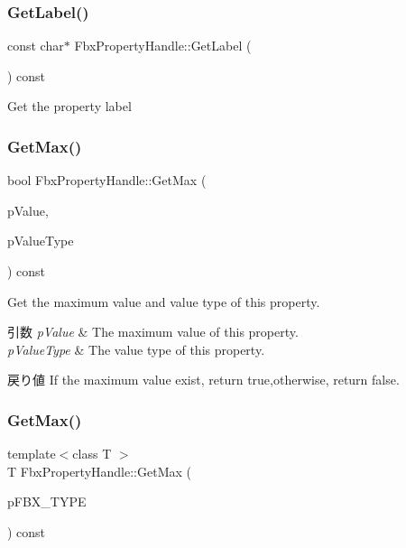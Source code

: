 \subsubsection{\texorpdfstring{Get\+Label()}{GetLabel()}}
{\footnotesize\ttfamily const char$\ast$ Fbx\+Property\+Handle\+::\+Get\+Label (\begin{DoxyParamCaption}{ }\end{DoxyParamCaption}) const}



Get the property label 

\mbox{\label{class_fbx_property_handle_a4752eebe7303b15577355b8fbecd4c6b}} 
\subsubsection{\texorpdfstring{Get\+Max()}{GetMax()}\hspace{0.1cm}{\footnotesize\ttfamily [1/2]}}
{\footnotesize\ttfamily bool Fbx\+Property\+Handle\+::\+Get\+Max (\begin{DoxyParamCaption}\item[{void $\ast$}]{p\+Value,  }\item[{\hyperlink{fbxpropertytypes_8h_a73913a5ddfb20e57c6f25e9e6784bd92}{E\+Fbx\+Type}}]{p\+Value\+Type }\end{DoxyParamCaption}) const}

Get the maximum value and value type of this property. 
\begin{DoxyParams}{引数}
{\em p\+Value} & The maximum value of this property. \\
\hline
{\em p\+Value\+Type} & The value type of this property. \\
\hline
\end{DoxyParams}
\begin{DoxyReturn}{戻り値}
If the maximum value exist, return true,otherwise, return false. 
\end{DoxyReturn}
\mbox{\label{class_fbx_property_handle_a170bbeb8c9dc5a4a1a1de93a9328f897}} 
\subsubsection{\texorpdfstring{Get\+Max()}{GetMax()}\hspace{0.1cm}{\footnotesize\ttfamily [2/2]}}
{\footnotesize\ttfamily template$<$class T $>$ \\
T Fbx\+Property\+Handle\+::\+Get\+Max (\begin{DoxyParamCaption}\item[{const T $\ast$}]{p\+F\+B\+X\+\_\+\+T\+Y\+PE }\end{DoxyParamCaption}) const}

